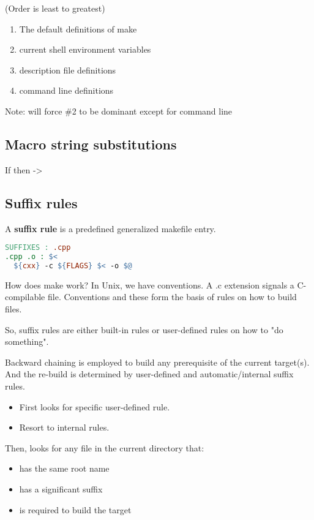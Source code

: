 (Order is least to greatest)

\begin{enumerate}
  \item The default definitions of make
  \item current shell environment variables
  \item description file definitions
  \item command line definitions
\end{enumerate}

Note:  will force \#2 to be dominant except for command line

\subsection{Macro string substitutions}

If  then  -> 

\subsection{Suffix rules}

A \textbf{suffix rule} is a predefined generalized makefile entry.

\begin{lstlisting}[language=make]
SUFFIXES : .cpp
.cpp .o : $<
  ${cxx} -c ${FLAGS} $< -o $@
\end{lstlisting}

How does make work? In Unix, we have conventions. A .c extension signals a C-compilable file. Conventions and these form the basis of rules on how to build files. 

So, suffix rules are either built-in rules or user-defined rules on how to "do something".

Backward chaining is employed to build any prerequisite of the current target(s). And the re-build is determined by user-defined and automatic/internal suffix rules.

\begin{itemize}
  \item First looks for specific user-defined rule.
  \item Resort to internal rules.
\end{itemize}

Then,  looks for any file in the current directory that:

\begin{itemize}
  \item has the same root name
  \item has a significant suffix
  \item is required to build the target
\end{itemize}